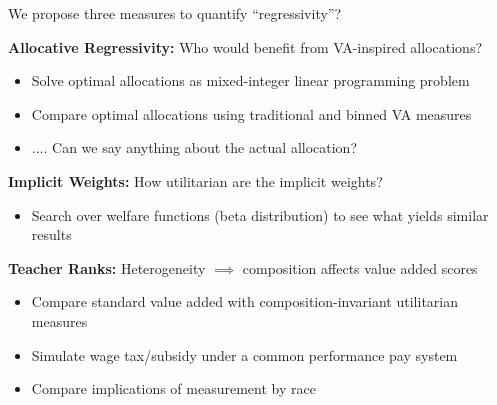 \documentclass[t,aspectratio=169,11pt]{beamer}
\begin{document}
\begin{frame}{We propose three measures to quantify ``regressivity''?}

\begin{wideitemize}
\item \textbf{Allocative Regressivity:} Who would benefit from VA-inspired allocations?
\begin{itemize}
    \item Solve optimal allocations as mixed-integer linear programming problem
    \item Compare optimal allocations using traditional and binned VA measures
    \item .... Can we say anything about the actual allocation?
    
\end{itemize}

\item \textbf{Implicit Weights:} How utilitarian are the implicit weights?
\begin{itemize}
    \item Search over welfare functions (beta distribution) to see what yields similar results
    
    \hyperlink{beta}{}
\end{itemize}

\item \textbf{Teacher Ranks:} Heterogeneity $\implies$ composition affects value added scores
\begin{itemize}
    \item Compare standard value added with composition-invariant utilitarian measures
    \item Simulate wage tax/subsidy under a common performance pay system %
    \item Compare implications of measurement by race
    
    \hyperlink{tap}{}
\end{itemize}



\end{wideitemize}

\end{frame}


\end{document}
